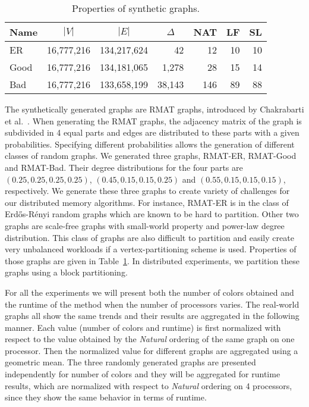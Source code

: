 \documentclass{article}
\newcommand{\card}[1]{\ensuremath{|#1|}}
\newcommand{\maxdegree}{\ensuremath{\Delta}}
\begin{document}
\begin{table}
  \centering
  \begin{tabular}{|l|r|r|r|r|r|r|} \hline
    \multicolumn{1}{|c|}{Name} & \multicolumn{1}{|c|}{$\card{V}$} & \multicolumn{1}{|c|}{$\card{E}$} & \multicolumn{1}{|c|}{$\maxdegree$} & \multicolumn{1}{|c|}{NAT} & \multicolumn{1}{|c|}{LF} & \multicolumn{1}{|c|}{SL}\\\hline
    ER   & 16,777,216 & 134,217,624 &     42 & 12  & 10 & 10\\
    Good & 16,777,216 & 134,181,065 &  1,278 & 28  & 15 & 14\\
    Bad  & 16,777,216 & 133,658,199 & 38,143 & 146 & 89 & 88 \\ \hline
  \end{tabular}
  \caption{Properties of synthetic graphs.}
  \label{tab:prop_rmat}
\end{table}

The synthetically generated graphs are RMAT graphs,
introduced by Chakrabarti et al.~\cite{RMAT}. 
When generating the RMAT graphs, the adjacency matrix of 
the graph is subdivided in 4 equal parts and edges are
distributed to these parts with a given probabilities.
Specifying different probabilities
allows the generation of different classes of random graphs. 
We generated three graphs, RMAT-ER, RMAT-Good and RMAT-Bad. Their degree
distributions for the four parts are $(0.25, 0.25, 0.25, 0.25)$, 
$(0.45, 0.15, 0.15, 0.25)$ and $(0.55, 0.15, 0.15, 0.15)$, respectively.
We generate these three graphs to create variety of challenges
for our distributed memory algorithms. For instance, RMAT-ER is
in the class of Erd\H os-R\'enyi random graphs which are known to be hard to
partition. Other two graphs are scale-free graphs with small-world
property and power-law degree distribution. This class of graphs
are also difficult to partition and easily create very unbalanced workloads
if a vertex-partitioning scheme is used. Properties of those graphs
are given in Table~\ref{tab:prop_rmat}. In distributed experiments, 
we partition these graphs using a block partitioning.

For all the experiments we will present both the number of colors
obtained and the runtime of the method when the number of processors
varies. The real-world graphs all show the same trends and their
results are aggregated in the following manner. Each value (number of
colors and runtime) is first normalized with respect to the value
obtained by the {\em Natural} ordering of the same graph on one
processor. Then the normalized value for different graphs are
aggregated using a geometric mean. The three randomly generated graphs
are presented independently for number of colors and they will be aggregated
for runtime results, which are normalized with respect to {\em Natural}
ordering on 4 processors, since they show the same behavior in terms of runtime.
\end{document}
